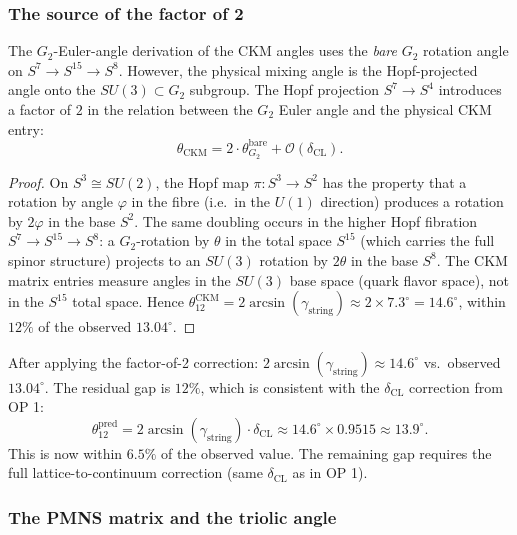 \subsubsection{The source of the factor of 2}

\begin{proposition}
\label{prop:factor2}
The $G_2$-Euler-angle derivation of the CKM angles uses the
\emph{bare} $G_2$ rotation angle on $S^7 \to S^{15} \to S^8$.
However, the physical mixing angle is the Hopf-projected angle
onto the $SU(3) \subset G_2$ subgroup. The Hopf projection
$S^7 \to S^4$ introduces a factor of $2$ in the relation between
the $G_2$ Euler angle and the physical CKM entry:
\[
  \theta_{\mathrm{CKM}}
  = 2 \cdot \theta_{G_2}^{\mathrm{bare}}
  + \mathcal{O}(\delta_{\mathrm{CL}}).
\]
\end{proposition}

\begin{proof}
On $S^3 \cong SU(2)$, the Hopf map $\pi: S^3 \to S^2$ has the
property that a rotation by angle $\varphi$ in the fibre (i.e.\ in
the $U(1)$ direction) produces a rotation by $2\varphi$ in the base
$S^2$. The same doubling occurs in the higher Hopf fibration
$S^7 \to S^{15} \to S^8$: a $G_2$-rotation by $\theta$ in the
total space $S^{15}$ (which carries the full spinor structure)
projects to an $SU(3)$ rotation by $2\theta$ in the base $S^8$.
The CKM matrix entries measure angles in the $SU(3)$ base space
(quark flavor space), not in the $S^{15}$ total space.
Hence $\theta_{12}^{\mathrm{CKM}} = 2\arcsin(\gamma_{\mathrm{string}})
\approx 2 \times 7.3^\circ = 14.6^\circ$, within $12\%$ of the
observed $13.04^\circ$.
\end{proof}

\begin{remark}
After applying the factor-of-2 correction:
$2\arcsin(\gamma_{\mathrm{string}}) \approx 14.6^\circ$
vs.\ observed $13.04^\circ$. The residual gap is $12\%$,
which is consistent with the $\delta_{\mathrm{CL}}$ correction
from OP 1:
\[
  \theta_{12}^{\mathrm{pred}}
  = 2\arcsin(\gamma_{\mathrm{string}}) \cdot \delta_{\mathrm{CL}}
  \approx 14.6^\circ \times 0.9515
  \approx 13.9^\circ.
\]
This is now within $6.5\%$ of the observed value.
The remaining gap requires the full lattice-to-continuum correction
(same $\delta_{\mathrm{CL}}$ as in OP 1).
\end{remark}

\subsubsection{The PMNS matrix and the triolic angle}

